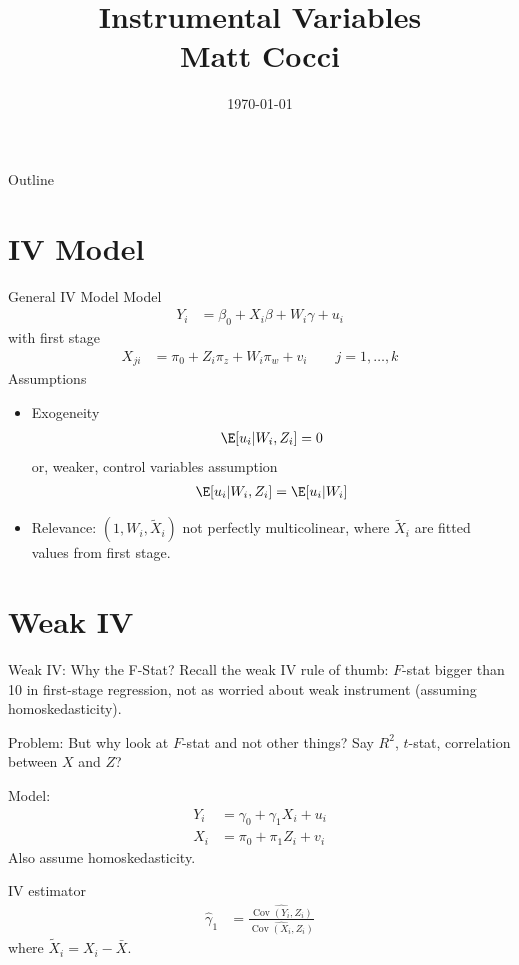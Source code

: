 \documentclass[aspectratio=169, handout]{beamer}
\title[]{Instrumental Variables \\ Matt Cocci}
\author[]{}
\date{\today}
\newcommand{\Cov}{\operatorname{Cov}}
\newcommand{\sumin}{\sum^n_{i=1}}
\begin{document}
\begin{frame}[plain]
\titlepage
\end{frame}


\begin{frame}{Outline}
\tableofcontents[hideallsubsections]
\end{frame}


\section{IV Model}

\begin{frame}{General IV Model}
Model
\begin{align*}
  Y_i &= \beta_0 + X_i\beta + W_i \gamma + u_i
\end{align*}
with first stage
\begin{align*}
  X_{ji}
  &=
  \pi_0
  +
  Z_i\pi_z
  +
  W_i\pi_w
  +
  v_i
  \qquad
  j=1,\ldots,k
\end{align*}
Assumptions
\begin{itemize}
  \item Exogeneity
    \begin{align*}
      \E[u_i|W_i,Z_i] = 0
    \end{align*}
    or, weaker, control variables assumption
    \begin{align*}
      \E[u_i|W_i,Z_i]
      =
      \E[u_i|W_i]
    \end{align*}
  \item
    Relevance:
    $(1,W_i,\tilde{X}_i)$ not perfectly multicolinear,
    where $\tilde{X}_i$ are fitted values from first stage.
\end{itemize}
\end{frame}


\section{Weak IV}

{\footnotesize
\begin{frame}{Weak IV: Why the F-Stat?}
Recall the weak IV \alert{rule of thumb}: $F$-stat bigger than 10 in
first-stage regression, not as worried about weak instrument (assuming
homoskedasticity).

\alert{Problem}:
But why look at $F$-stat and not other things?
Say $R^2$, $t$-stat, correlation between $X$ and $Z$?

\alert{Model}:
\begin{align*}
  Y_i &= \gamma_0 + \gamma_1 X_i + u_i
  \\
  X_i &= \pi_0 + \pi_1 Z_i + v_i
\end{align*}
Also assume homoskedasticity.

\alert{IV estimator}
\begin{align*}
  \hat{\gamma}_1
  &=
  \frac{\widehat{\Cov(Y_i,Z_i)}}{\widehat{\Cov(X_i,Z_i)}}
\end{align*}
where $\tilde{X}_i=X_i-\bar{X}$.
\end{frame}
}
\end{document}
